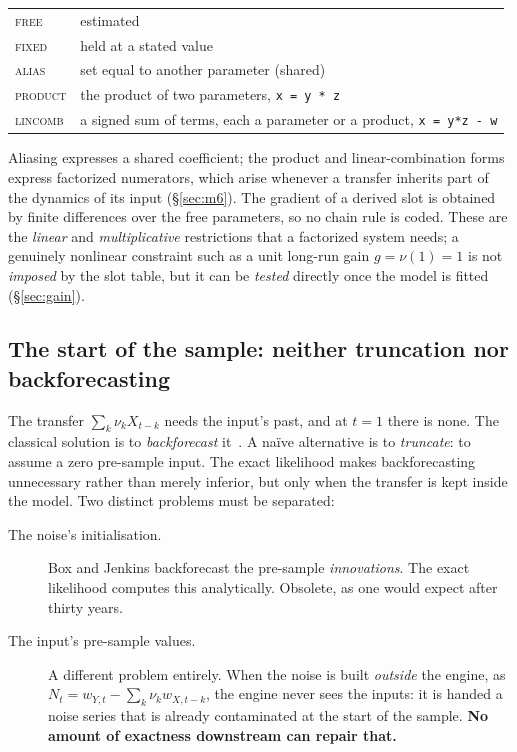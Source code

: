 \documentclass[11pt,a4paper]{article}
\theoremstyle{plain}
\theoremstyle{remark}
\begin{document}
\begin{center}
\begin{tabular}{ll}
\toprule
\textsc{free} & estimated \\
\textsc{fixed} & held at a stated value \\
\textsc{alias} & set equal to another parameter (shared) \\
\textsc{product} & the product of two parameters, \texttt{x = y * z} \\
\textsc{lincomb} & a signed sum of terms, each a parameter or a product,
   \texttt{x = y*z - w} \\
\bottomrule
\end{tabular}
\end{center}

\noindent
Aliasing expresses a shared coefficient; the product and linear-combination forms
express factorized numerators, which arise whenever a transfer inherits part of the
dynamics of its input (\S\ref{sec:m6}). The gradient of a derived slot is obtained
by finite differences over the free parameters, so no chain rule is coded. These
are the \emph{linear} and \emph{multiplicative} restrictions that a factorized
system needs; a genuinely nonlinear constraint such as a unit long-run gain
$g=\nu(1)=1$ is not \emph{imposed} by the slot table, but it can be \emph{tested}
directly once the model is fitted (\S\ref{sec:gain}).

\subsection{The start of the sample: neither truncation nor backforecasting}
\label{sec:truncation}

The transfer $\sum_k \nu_k X_{t-k}$ needs the input's past, and at $t=1$ there is
none. The classical solution is to \emph{backforecast} it~\cite[chs.~6,~11]{bjr1994}.
A na\"ive alternative is to \emph{truncate}: to assume a zero pre-sample input. The
exact likelihood makes backforecasting unnecessary rather than merely inferior, but
only when the transfer is kept inside the model. Two distinct problems must be
separated:

\begin{description}
\item[The noise's initialisation.] Box and Jenkins backforecast the pre-sample
  \emph{innovations}. The exact likelihood computes this analytically. Obsolete,
  as one would expect after thirty years.
\item[The input's pre-sample values.] A different problem entirely. When the noise
  is built \emph{outside} the engine, as $N_t = w_{Y,t} - \sum_k \nu_k
  w_{X,t-k}$, the engine never sees the inputs: it is handed a noise series that
  is already contaminated at the start of the sample. \textbf{No amount of exactness
  downstream can repair that.}
\end{description}
\end{document}
